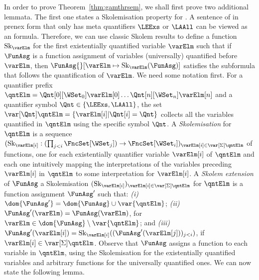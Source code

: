 \documentclass[authoryear]{elsarticle}
\newcommand{\SkolemizedSOF}{\text{Sk}}
\begin{document}
In order to prove Theorem~\ref{thm:gamthrsem}, we shall first prove two
additional lemmata.
%
The first one states a Skolemisation property for \Meta. A sentence of \Meta in
prenex form that only has meta quantifiers $\LEExs$ or $\LAAll$ can be viewed as
an \SOL formula.
%
Therefore, we can use classic Skolem results to define a function
$\SkolemizedSOF_{\varElm}$ for the first existentially quantified variable
$\varElm$ such that if $\FunAsg$ is a function assignment of variables
(universally) quantified before $\varElm$, then $\FunAsg{}[\varElm \mapsto
  \SkolemizedSOF_{\varElm}(\FunAsg)]$ satisfies the subformula that follows the
quantification of $\varElm$.
%
We need some notation first.  For a quantifier prefix $\qntElm =
\Qnt[0][\WSet_0]\varElm[0] \ldots \Qnt[n][\WSet_n]\varElm[n]$ and a quantifier
symbol $\Qnt \in \{\LEExs, \LAAll\}$, the set $\var[{\Qnt}]{\qntElm} =
\{\varElm[i] | \Qnt[i] = \Qnt\}$ collects all the variables quantified in
$\qntElm$ using the specific symbol $\Qnt$.
%
A \emph{Skolemisation} for $\qntElm$ is a sequence $(\SkolemizedSOF_{\varElm[i]}
:(\prod_{j<i} \FncSet[{\WSet_j}]{}) \rightarrow
\FncSet[{\WSet_i}]{})_{\varElm[i]\in \var[{\Sigma}]{\qntElm}}$ of functions, one
for each existentially quantifier variable $\varElm[i]$ of $\qntElm$ and each
one intuitively mapping the interpretations of the variables preceding
$\varElm[i]$ in $\qntElm$ to some interpretation for $\varElm[i]$.
%
A \emph{Skolem extension} of $\FunAsg$ \wrt a Skolemisation
$(\SkolemizedSOF_{\varElm[i]})_{\varElm[i]\in \var[{\Sigma}]{\qntElm}}$ for $\qntElm$ is a
function assignment $\FunAsg'$ such that: \emph{(i)} $\dom{\FunAsg'} =
\dom{\FunAsg} \cup \var{\qntElm}$; \emph{(ii)} $\FunAsg'(\varElm) = \FunAsg(\varElm)$, for
$\varElm \in \dom{\FunAsg}\setminus \var{\qntElm}$; and \emph{(iii)}
$\FunAsg'(\varElm[i]) = \SkolemizedSOF_{\varElm[i]}((\FunAsg'(\varElm[j]))_{j<i})$,
if $\varElm[i] \in \var[{\Sigma}]{\qntElm}$.
%
Observe that $\FunAsg$ assigns a function to each variable in $\qntElm$, using
the Skolemisation for the existentially quantified variables and arbitrary
functions for the universally quantified ones. We can now state the following
lemma.
\end{document}
